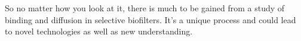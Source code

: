 So no matter how you look at it, there is much to be gained from a study of binding and diffusion in selective biofilters.  It's a unique process and could lead to novel technologies as well as new understanding.





